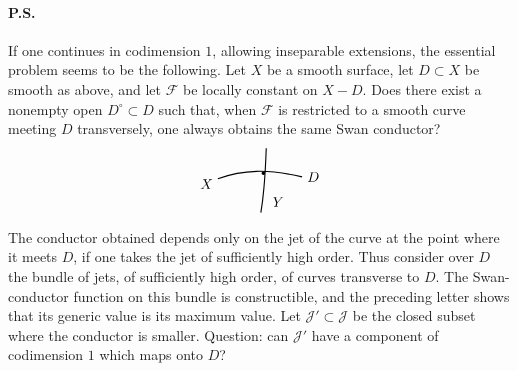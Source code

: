 \documentclass[11pt]{article}
\newcommand{\jetSketch}{%
\begin{tikzpicture}[scale=.9,baseline=-.5ex]
  \draw[thick] (-.25,.2) .. controls (.45,.45) and (1.15,.48) .. (2.1,.25) node[right]{$D$};
  \draw[thick] (.95,-.75) .. controls (1.05,-.15) and (1.08,.45) .. (1.1,1.05);
  \node[right] at (1.14,-.45){$Y$};
  \node[left] at (-.25,.05){$X$};
  \fill (1.02,.35) circle (1.4pt);
\end{tikzpicture}%
}
\newcommand{\F}{\mathcal F}
\begin{document}
\paragraph{P.S.}
If one continues in codimension \(1\), allowing inseparable extensions, the essential problem seems to be the following. Let \(X\) be a smooth surface, let \(D\subset X\) be smooth as above, and let \(\F\) be locally constant on \(X-D\). Does there exist a nonempty open \(D^\circ\subset D\) such that, when \(\F\) is restricted to a smooth curve meeting \(D\) transversely, one always obtains the same Swan conductor?
\[
\jetSketch
\]

The conductor obtained depends only on the jet of the curve at the point where it meets \(D\), if one takes the jet of sufficiently high order. Thus consider over \(D\) the bundle of jets, of sufficiently high order, of curves transverse to \(D\). The Swan-conductor function on this bundle is constructible, and the preceding letter shows that its generic value is its maximum value. Let \(\mathcal J'\subset\mathcal J\) be the closed subset where the conductor is smaller. Question: can \(\mathcal J'\) have a component of codimension \(1\) which maps onto \(D\)?
\end{document}
